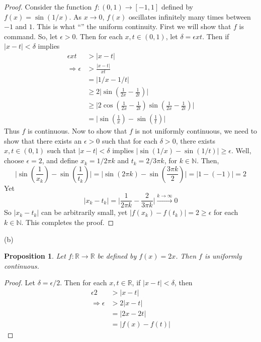 \documentclass[11pt]{amsart}
\newtheorem*{prop}{Proposition}
\begin{document}
\begin{proof}
        Consider the function $f:(0,1) \longrightarrow [-1,1]$ defined by $f(x) = \sin(1/x)$. As $x\longrightarrow 0$, $f(x)$ oscillates infinitely many times between $-1$ and $1$. This is what ``'' the uniform continuity. First we will show that $f$ is command. So, let $\epsilon > 0$. Then for each $x,t\in (0,1)$, let $\delta = \epsilon x t$. Then if $|x-t| < \delta$ implies 
	\begin{align*}
	        \epsilon x t & > |x - t| \\
		\Rightarrow \epsilon & > \frac{|x-t|}{xt} \\
		& = |1/x - 1/t| \\
		& \geq 2\bigg| \sin\left(\frac{1}{2x} - \frac{1}{2t}\right)\bigg| \\
		& \geq \bigg| 2\cos\left(\frac{1}{2x} - \frac{1}{2t}\right)\sin\left(\frac{1}{2x} - \frac{1}{2t}\right)\bigg| \\
		& = \bigg|\sin\left(\frac{1}{x}\right) - \sin\left(\frac{1}{t}\right)\bigg|
	\end{align*}
	Thus $f$ is continuous. Now to show that $f$ is not uniformly continuous, we need to show that there exists an $\epsilon > 0$ such that for each $\delta > 0$, there exists $x,t\in (0,1)$ such that $|x-t| < \delta$ implies $|\sin(1/x) - \sin(1/t)| \geq \epsilon$. Well, choose $\epsilon = 2$, and define $x_{k} = 1 / 2\pi k$ and $t_{k} = 2 / 3\pi k$, for $k\in \mathbb{N}$. Then,
	\[ \bigg|\sin\left(\frac{1}{x_{k}}\right) - \sin\left(\frac{1}{t_{k}}\right)\bigg| = \bigg|\sin\left(2\pi k\right) - \sin\left(\frac{3\pi k}{2}\right)\bigg| = |1 - (-1)| = 2 \]
	Yet
	\[ |x_{k} - t_{k}| = \bigg|\frac{1}{2\pi k} - \frac{2}{3\pi k}\bigg| \stackrel{k\rightarrow \infty}{\longrightarrow} 0
	\]
	So $|x_{k} - t_{k}|$ can be arbitrarily small, yet $|f(x_{k}) - f(t_{k})| = 2 \geq \epsilon$ for each $k\in \mathbb{N}$. This completes the proof.
\end{proof}

(b) 
\begin{prop}
	Let $f: \mathbb{R} \longrightarrow \mathbb{R}$ be defined by $f(x) = 2x$. Then $f$ is uniformly continuous.
\end{prop}

\begin{proof}
	Let $\delta = \epsilon / 2$. Then for each $x,t\in\mathbb{R}$, if $|x - t| < \delta$, then 
	\begin{align*}
		\epsilon  2 & > |x-t| \\
		\Rightarrow \epsilon & > 2|x-t| \\
		& = |2x - 2t| \\
		& = |f(x) - f(t)|
	\end{align*}
\end{proof}
\end{document}
